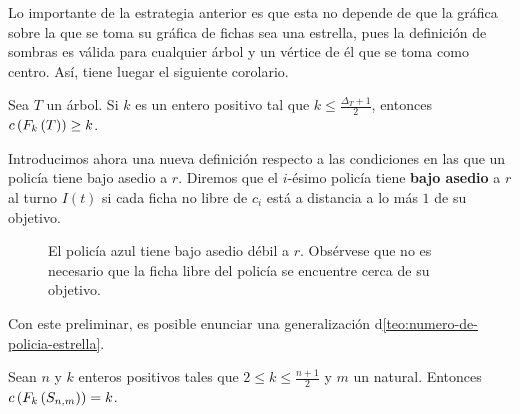 Lo importante de la estrategia anterior es que esta no depende de que la
gr\'afica sobre la que se toma su gr\'afica de fichas sea una estrella, pues la
definici\'on de sombras es v\'alida para cualquier \'arbol y un v\'ertice de
\'el que se toma como centro. As\'i, tiene luegar el siguiente corolario.

\begin{corolario}
\label{cor:cota-inf-arbol}
    Sea $T$ un \'arbol. Si $k$ es un entero positivo tal que $k\leq
    \frac{\Delta_T+1}{2}$, entonces $c\left( F_{k}\left( T\right)\right)\geq k$.
\end{corolario}

Introducimos ahora una nueva definici\'on respecto a las condiciones en las que
un polic\'ia tiene bajo asedio a $r$. Diremos que el $i$-\'esimo polic\'ia tiene
\textbf{bajo asedio}  a $r$ al turno $I(t)$ si cada
ficha no libre de $c_i$ est\'a a distancia a lo m\'as $1$ de su objetivo.

\begin{figure}[ht!]
    \centering
    \captionsetup{font=footnotesize}
    \caption{El polic\'ia azul tiene bajo asedio d\'ebil a $r$. Obs\'ervese que
    no es necesario que la ficha libre del polic\'ia se encuentre cerca de su
    objetivo.}
    \label{fig:asedio-debil}
\end{figure}

\newpage

Con este preliminar, es posible enunciar una generalizaci\'on
d\cref{teo:numero-de-policia-estrella}.

\begin{teorema}
\label{teo:numero-de-policia-estrella-subdivisiones}
    Sean $n$ y $k$ enteros positivos tales que $2\leq k \leq \frac{n+1}{2}$ y
    $m$ un natural. Entonces $c\left( F_{k}\left( S_{n,m}\right)\right)=k$.
\end{teorema}

